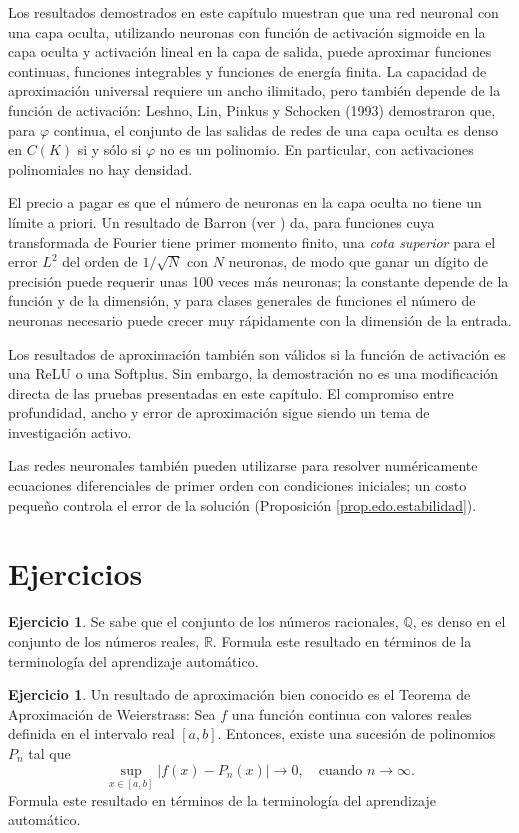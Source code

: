 \documentclass[12pt, a4paper]{amsbook}
\newcommand{\R}{{\mathbb R}}
\newcommand{\Q}{{\mathbb Q}}
\theoremstyle{remark}
\theoremstyle{definition}
\newtheorem{ejer}[teo]{Ejercicio}
\numberwithin{section}{chapter}
\numberwithin{subsection}{section}
\numberwithin{equation}{section}
\numberwithin{figure}{chapter}
\begin{document}
Los resultados demostrados en este capítulo muestran que una red neuronal con una capa oculta, utilizando neuronas con función de activación sigmoide en la capa oculta y activación lineal en la capa de salida, puede aproximar funciones continuas, funciones integrables y funciones de energía finita. La capacidad de aproximación universal requiere un ancho ilimitado, pero también depende de la función de activación: Leshno, Lin, Pinkus y Schocken (1993) demostraron que, para $\varphi$ continua, el conjunto de las salidas de redes de una capa oculta es denso en $C(K)$ si y sólo si $\varphi$ no es un polinomio. En particular, con activaciones polinomiales no hay densidad.

El precio a pagar es que el número de neuronas en la capa oculta no tiene un límite a priori. Un resultado de Barron (ver \cite{Barron}) da, para funciones cuya transformada de Fourier tiene primer momento finito, una {\em cota superior} para el error $L^2$ del orden de $1/\sqrt N$ con $N$ neuronas, de modo que ganar un dígito de precisión puede requerir unas 100 veces más neuronas; la constante depende de la función y de la dimensión, y para clases generales de funciones el número de neuronas necesario puede crecer muy rápidamente con la dimensión de la entrada.

Los resultados de aproximación también son válidos si la función de activación es una ReLU o una Softplus. Sin embargo, la demostración no es una modificación directa de las pruebas presentadas en este capítulo. El compromiso entre profundidad, ancho y error de aproximación sigue siendo un tema de investigación activo. 

Las redes neuronales también pueden utilizarse para resolver numéricamente ecuaciones diferenciales de primer orden con condiciones iniciales; un costo pequeño controla el error de la solución (Proposición \ref{prop.edo.estabilidad}).


\section{Ejercicios}\label{sec.c9.6}

\begin{ejer} 
Se sabe que el conjunto de los números racionales, $\Q$, es denso en el conjunto de los números reales, $\R$. Formula este resultado en términos de la terminología del aprendizaje automático.
\end{ejer}


\begin{ejer} 
Un resultado de aproximación bien conocido es el Teorema de Aproximación de Weierstrass: Sea $f$ una función continua con valores reales definida en el intervalo real $[a, b]$. Entonces, existe una sucesión de polinomios $P_n$ tal que
$$
\sup_{x \in [a,b]} |f(x) - P_n(x)| \to 0, \quad \text{cuando } n \to \infty.
$$
Formula este resultado en términos de la terminología del aprendizaje automático.
\end{ejer}
\end{document}
